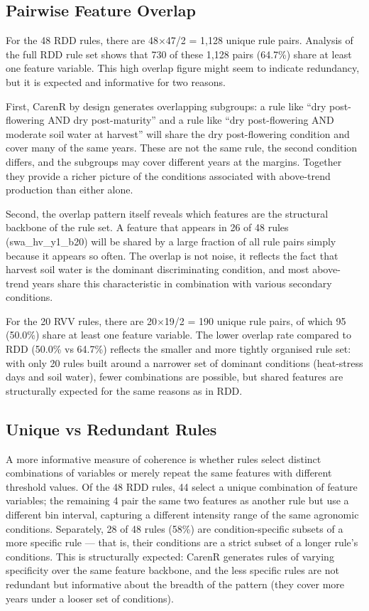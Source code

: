 \subsection{Pairwise Feature Overlap}\label{sub:pairwise_feature_overlap}

For the 48 RDD rules, there are 48$\times$47/2 = 1,128 unique rule pairs. Analysis of the full RDD rule set shows that 730 of these 1,128 pairs (64.7\%) share at least one feature variable. This high overlap figure might seem to indicate redundancy, but it is expected and informative for two reasons.

First, CarenR by design generates overlapping subgroups: a rule like ``dry post-flowering AND dry post-maturity'' and a rule like ``dry post-flowering AND moderate soil water at harvest'' will share the dry post-flowering condition and cover many of the same years. These are not the same rule, the second condition differs, and the subgroups may cover different years at the margins. Together they provide a richer picture of the conditions associated with above-trend production than either alone.

Second, the overlap pattern itself reveals which features are the structural backbone of the rule set. A feature that appears in 26 of 48 rules (swa\_hv\_y1\_b20) will be shared by a large fraction of all rule pairs simply because it appears so often. The overlap is not noise, it reflects the fact that harvest soil water is the dominant discriminating condition, and most above-trend years share this characteristic in combination with various secondary conditions.

For the 20 RVV rules, there are 20$\times$19/2 = 190 unique rule pairs, of which 95 (50.0\%) share at least one feature variable. The lower overlap rate compared to RDD (50.0\% vs 64.7\%) reflects the smaller and more tightly organised rule set: with only 20 rules built around a narrower set of dominant conditions (heat-stress days and soil water), fewer combinations are possible, but shared features are structurally expected for the same reasons as in RDD.


\subsection{Unique vs Redundant Rules}\label{sub:unique_vs_redundant_rules}

A more informative measure of coherence is whether rules select distinct combinations of variables or merely repeat the same features with different threshold values. Of the 48 RDD rules, 44 select a unique combination of feature variables; the remaining 4 pair the same two features as another rule but use a different bin interval, capturing a different intensity range of the same agronomic conditions. Separately, 28 of 48 rules (58\%) are condition-specific subsets of a more specific rule --- that is, their conditions are a strict subset of a longer rule's conditions. This is structurally expected: CarenR generates rules of varying specificity over the same feature backbone, and the less specific rules are not redundant but informative about the breadth of the pattern (they cover more years under a looser set of conditions).

